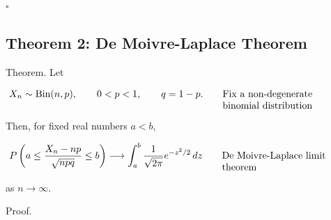 \documentclass{article}
\newcommand{\justwidth}{0.36\textwidth}
\newcommand{\just}[1]{\parbox[t]{\justwidth}{\raggedright #1}}
\begin{document}
$\square$

\subsection{Theorem 2: De Moivre-Laplace Theorem}
Theorem. Let

\begin{align*}
X_n
&\sim
\operatorname{Bin}(n,p),
\qquad
0<p<1,
\qquad
q=1-p.
\tag*{\just{Fix a non-degenerate binomial distribution}}
\end{align*}

Then, for fixed real numbers $a<b$,

\begin{align*}
P\left(
a
\leq
\frac{X_n-np}{\sqrt{npq}}
\leq
b
\right)
&\longrightarrow
\int_a^b
\frac{1}{\sqrt{2\pi}}
e^{-z^2/2}
\,dz
\tag*{\just{De Moivre-Laplace limit theorem}}
\end{align*}

as $n\rightarrow\infty$.

Proof.

\end{document}
